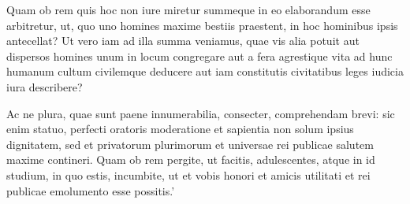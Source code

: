 Quam ob rem quis hoc non iure miretur summeque in eo elaborandum esse arbitretur, ut, quo uno homines maxime bestiis praestent, in hoc hominibus ipsis antecellat? Ut vero iam ad illa summa veniamus, quae vis alia potuit aut dispersos homines unum in locum congregare aut a fera agrestique vita ad hunc humanum cultum civilemque deducere aut iam constitutis civitatibus leges iudicia iura describere?

Ac ne plura, quae sunt paene innumerabilia, consecter, comprehendam brevi: sic enim statuo, perfecti oratoris moderatione et sapientia non solum ipsius dignitatem, sed et privatorum plurimorum et universae rei publicae salutem maxime contineri. Quam ob rem pergite, ut facitis, adulescentes, atque in id studium, in quo estis, incumbite, ut et vobis honori et amicis utilitati et rei publicae emolumento esse possitis.' 

